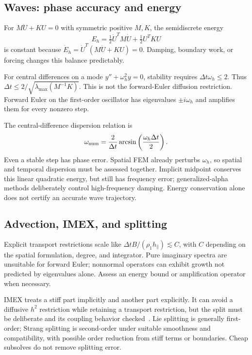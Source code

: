 \documentclass[11pt,a4paper]{article}
\begin{document}
\subsection{Waves: phase accuracy and energy}
For $M\ddot U+KU=0$ with symmetric positive $M,K$, the semidiscrete energy
\begin{equation}
E_h=\tfrac12\dot U^TM\dot U+\tfrac12U^TKU
\end{equation}
is constant because $\dot E_h=\dot U^T(M\ddot U+KU)=0$. Damping, boundary work, or forcing changes this balance predictably.

For central differences on a mode $y''+\omega_h^2y=0$, stability requires $\Delta t\omega_h\le2$. Thus $\Delta t\le2/\sqrt{\lambda_{\max}(M^{-1}K)}$. This is not the forward-Euler diffusion restriction. Forward Euler on the first-order oscillator has eigenvalues $\pm i\omega_h$ and amplifies them for every nonzero step.

The central-difference dispersion relation is
\begin{equation}
\omega_{\rm num}=\frac{2}{\Delta t}
\arcsin\left(\frac{\omega_h\Delta t}{2}\right).
\end{equation}
Even a stable step has phase error. Spatial FEM already perturbs $\omega_h$, so spatial and temporal dispersion must be assessed together. Implicit midpoint conserves this linear quadratic energy, but still has frequency error; generalized-alpha methods deliberately control high-frequency damping. Energy conservation alone does not certify an accurate wave trajectory.

\subsection{Advection, IMEX, and splitting}
Explicit transport restrictions scale like $\Delta t B/(\rho_1h_\parallel)\lesssim C$, with $C$ depending on the spatial formulation, degree, and integrator. Pure imaginary spectra are unsuitable for forward Euler; nonnormal operators can exhibit growth not predicted by eigenvalues alone. Assess an energy bound or amplification operator when necessary.

IMEX treats a stiff part implicitly and another part explicitly. It can avoid a diffusive $h^2$ restriction while retaining a transport restriction, but the split must be deliberate and its coupling behavior checked~\cite{petscts}. Lie splitting is generally first-order; Strang splitting is second-order under suitable smoothness and compatibility, with possible order reduction from stiff terms or boundaries. Cheap subsolves do not remove splitting error.
\end{document}
